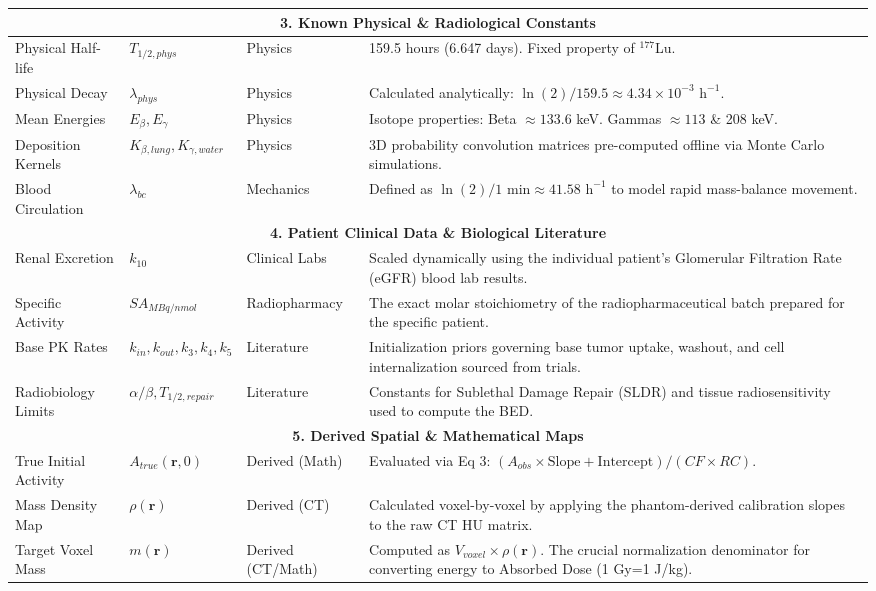 \documentclass[11pt,a4paper]{article}
\begin{document}
\begin{table}[h!]
\begin{tabularx}{\textwidth}{@{}l l l X@{}}
\multicolumn{4}{c}{\textbf{3. Known Physical \& Radiological Constants}} \\ \midrule
Physical Half-life & $T_{1/2, phys}$ & Physics & 159.5 hours (6.647 days). Fixed property of $^{177}$Lu. \\
Physical Decay & $\lambda_{phys}$ & Physics & Calculated analytically: $\ln(2)/159.5 \approx 4.34 \times 10^{-3} \text{ h}^{-1}$. \\
Mean Energies & $E_\beta, E_\gamma$ & Physics & Isotope properties: Beta $\approx 133.6$ keV. Gammas $\approx 113$ \& 208 keV. \\
Deposition Kernels & $K_{\beta, lung}, K_{\gamma, water}$ & Physics & 3D probability convolution matrices pre-computed offline via Monte Carlo simulations. \\
Blood Circulation & $\lambda_{bc}$ & Mechanics & Defined as $\ln(2)/1 \text{ min} \approx 41.58 \text{ h}^{-1}$ to model rapid mass-balance movement. \\ \midrule
\multicolumn{4}{c}{\textbf{4. Patient Clinical Data \& Biological Literature}} \\ \midrule
Renal Excretion & $k_{10}$ & Clinical Labs & Scaled dynamically using the individual patient's Glomerular Filtration Rate (eGFR) blood lab results. \\
Specific Activity & $SA_{MBq/nmol}$ & Radiopharmacy & The exact molar stoichiometry of the radiopharmaceutical batch prepared for the specific patient. \\
Base PK Rates & $k_{in}, k_{out}, k_3, k_4, k_5$ & Literature & Initialization priors governing base tumor uptake, washout, and cell internalization sourced from trials. \\
Radiobiology Limits & $\alpha/\beta, T_{1/2, repair}$ & Literature & Constants for Sublethal Damage Repair (SLDR) and tissue radiosensitivity used to compute the BED. \\ \midrule
\multicolumn{4}{c}{\textbf{5. Derived Spatial \& Mathematical Maps}} \\ \midrule
True Initial Activity & $A_{true}(\mathbf{r}, 0)$ & Derived (Math) & Evaluated via Eq 3: $(A_{obs} \times \text{Slope} + \text{Intercept}) / (CF \times RC)$. \\
Mass Density Map & $\rho(\mathbf{r})$ & Derived (CT) & Calculated voxel-by-voxel by applying the phantom-derived calibration slopes to the raw CT HU matrix. \\
Target Voxel Mass & $m(\mathbf{r})$ & Derived (CT/Math) & Computed as $V_{voxel} \times \rho(\mathbf{r})$. The crucial normalization denominator for converting energy to Absorbed Dose (1 Gy=1 J/kg). \\

\end{tabularx}
\end{table}
\end{document}
